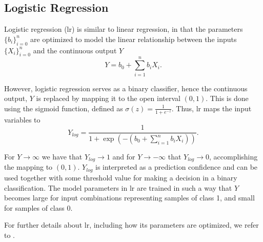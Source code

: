 \subsection{Logistic Regression}
Logistic regression (\gls{lr}) is similar to linear regression, in that the parameters $\{b_i\}_{i=0}^n$ are optimized to model the linear relationship between the inputs $\{X_i\}_{i=0}^n$ and the continuous output $Y$
\begin{equation}
	Y= b_0+\sum_{i=1}^n b_iX_i.
\end{equation}

However, logistic regression serves as a binary classifier, hence the continuous output, $Y$ is replaced by mapping it to the open interval $(0,1)$. This is done using the sigmoid function, defined as $\sigma(z)=\frac{1}{1+e^{-z}}$. Thus, \gls{lr} maps the input variables to
\begin{equation}
\label{eq:log_eq}
	Y_{log}= \frac{1}{1+\exp(-(b_0 + \sum_{i=1}^n b_iX_i))}.
\end{equation}

For $Y\rightarrow \infty$ we have that $Y_{log}\rightarrow 1$ and for $Y\rightarrow -\infty$ that $Y_{log}\rightarrow 0$, accomplishing the mapping to $(0,1)$. $Y_{log}$ is interpreted as a prediction confidence and can be used together with some threshold value for making a decision in a binary classification. The model parameters in \gls{lr} are trained in such a way that $Y$ becomes large for input combinations representing samples of class 1, and small for samples of class 0.

For further details about \gls{lr}, including how its parameters are optimized, we refer to \citep{shalev-shwartz_ben-david_2016}.





